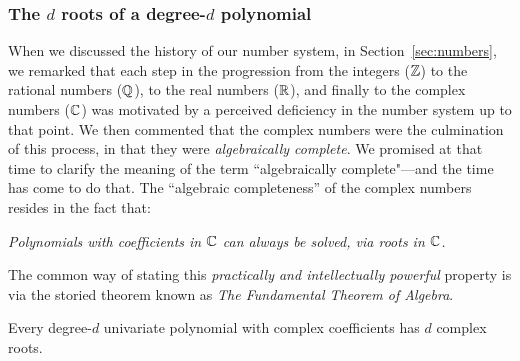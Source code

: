 \subsubsection{The $d$ roots of a degree-$d$ polynomial}
\label{sec:fund-thm-algebra}


When we discussed the history of our number system, in Section~\ref{sec:numbers}, we remarked that each step in the progression from the integers ($\mathbb{Z}$) to the rational numbers ($\mathbb{Q}$), to the real numbers ($\mathbb{R}$), and finally to the complex numbers ($\mathbb{C}$) was motivated by a perceived deficiency in the number system up to that point.  We then commented that the complex numbers were the culmination of this process, in that they were {\it algebraically complete}.  We promised at that time to clarify the meaning of the term ``algebraically complete"---and the time has come to do that.  The ``algebraic completeness'' of the complex numbers resides in the fact that:

\smallskip

{\em Polynomials with coefficients in $\mathbb{C}$ can always be solved, via roots in $\mathbb{C}$.}

\smallskip

\noindent
The common way of stating this {\em practically and intellectually powerful} property is via the storied theorem known as {\it The Fundamental Theorem of Algebra}.

\begin{theorem}
\label{thm:fund-thm-algebra}
Every degree-$d$ univariate polynomial with complex coefficients has $d$ complex roots.
\end{theorem}

\medskip

\noindent  {}

\bigskip

   
 

